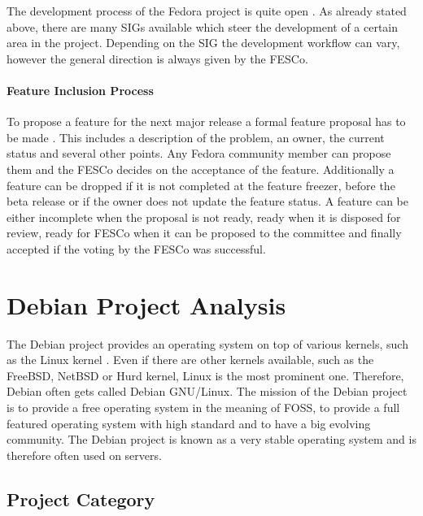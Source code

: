 The development process of the Fedora project is quite open
\cite{FedoraReleaseEngineering,FedoraSIG}. As already stated above, there are
many \acp{SIG} available which steer the development of a certain area in the
project. Depending on the \ac{SIG} the development workflow can vary, however
the general direction is always given by the \ac{FESCo}.

\paragraph{Feature Inclusion Process}

To propose a feature for the next major release a formal feature proposal has
to be made \cite{FedoraFeatures,FedoraFESCo}. This includes a description of
the problem, an owner, the current status and several other points. Any Fedora
community member can propose them and the \ac{FESCo} decides on the acceptance
of the feature. Additionally a feature can be dropped if it is not completed at
the feature freezer, before the beta release or if the owner does not update
the feature status. A feature can be either incomplete when the proposal is not
ready, ready when it is disposed for review, ready for \ac{FESCo} when it can
be proposed to the committee and finally accepted if the voting by the
\ac{FESCo} was successful.


\section{Debian Project Analysis} %


\noindent The Debian project provides an operating system on top of various
kernels, such as the Linux kernel \cite{DebianAbout,DebianPorts}. Even if there
are other kernels available, such as the FreeBSD, NetBSD or Hurd kernel, Linux
is the most prominent one. Therefore, Debian often gets called Debian
\ac{GNU}/Linux. The mission of the Debian project is to provide a free
operating system in the meaning of \ac{FOSS}, to provide a full featured
operating system with high standard and to have a big evolving community. The
Debian project is known as a very stable operating system and is therefore
often used on servers.

\subsection{Project Category}

